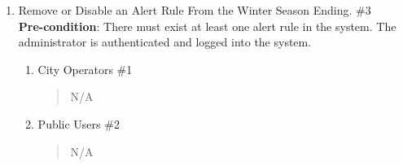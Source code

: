 \documentclass[]{article}
\begin{document}
\begin{enumerate}[{\bf BE3.}]
	\item Remove or Disable an Alert Rule From the Winter Season Ending. \#3 \\         
    \textbf{Pre-condition}: There must exist at least one alert rule in the system. The administrator is authenticated and logged into the system.
    
		\begin{enumerate}[{\bf VP1.}]
			\item City Operators \#1 
                \begin{quote}
                    N/A
                \end{quote}
                
			\item Public Users \#2 
				\begin{quote}
				    N/A
				\end{quote}
                

\end{enumerate}
\end{enumerate}
\end{document}
